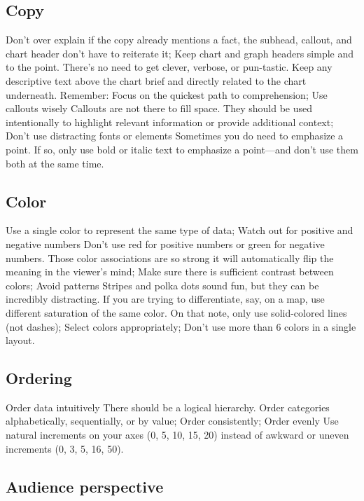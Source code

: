 \documentclass[]{book}
\theoremstyle{definition}
\theoremstyle{definition}
\theoremstyle{definition}
\theoremstyle{remark}
\begin{document}
\subsection{Copy}\label{copy}

Don't over explain if the copy already mentions a fact, the subhead,
callout, and chart header don't have to reiterate it; Keep chart and
graph headers simple and to the point. There's no need to get clever,
verbose, or pun-tastic. Keep any descriptive text above the chart brief
and directly related to the chart underneath. Remember: Focus on the
quickest path to comprehension; Use callouts wisely Callouts are not
there to fill space. They should be used intentionally to highlight
relevant information or provide additional context; Don't use
distracting fonts or elements Sometimes you do need to emphasize a
point. If so, only use bold or italic text to emphasize a point---and
don't use them both at the same time.

\subsection{Color}\label{color}

Use a single color to represent the same type of data; Watch out for
positive and negative numbers Don't use red for positive numbers or
green for negative numbers. Those color associations are so strong it
will automatically flip the meaning in the viewer's mind; Make sure
there is sufficient contrast between colors; Avoid patterns Stripes and
polka dots sound fun, but they can be incredibly distracting. If you are
trying to differentiate, say, on a map, use different saturation of the
same color. On that note, only use solid-colored lines (not dashes);
Select colors appropriately; Don't use more than 6 colors in a single
layout.

\subsection{Ordering}\label{ordering}

Order data intuitively There should be a logical hierarchy. Order
categories alphabetically, sequentially, or by value; Order
consistently; Order evenly Use natural increments on your axes (0, 5,
10, 15, 20) instead of awkward or uneven increments (0, 3, 5, 16, 50).

\subsection{Audience perspective}\label{audience-perspective}
\end{document}

